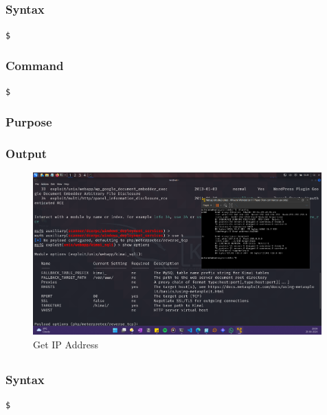 \documentclass[11pt]{article}
\begin{document}
\subsection{}

\subsubsection*{Syntax}
\begin{verbatim}
$
\end{verbatim}

\subsubsection*{Command}
\begin{verbatim}
$
\end{verbatim}

\subsubsection*{Purpose}

\subsubsection*{Output}
\begin{figure}[H]
    \centering
    \includegraphics[width=0.99\textwidth]{a3_ss (24).png}
    \caption{Get IP Address}
    \label{fig:1}
\end{figure}
\subsection{}

\subsubsection*{Syntax}
\begin{verbatim}
$
\end{verbatim}
\end{document}
